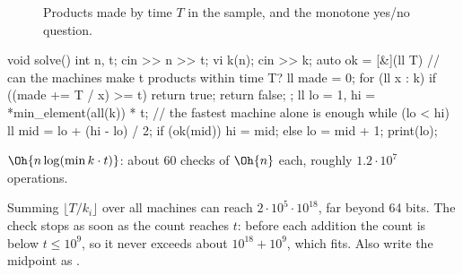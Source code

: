 \begin{figure}[H]
\centering
{}
\caption{Products made by time $T$ in the sample, and the monotone yes/no question.}
\end{figure}

\begin{code}
void solve() {
    int n, t;
    cin >> n >> t;
    vi k(n);
    cin >> k;
    auto ok = [&](ll T) {  // can the machines make t products within time T?
        ll made = 0;
        for (ll x : k)
            if ((made += T / x) >= t) return true;
        return false;
    };
    ll lo = 1, hi = *min_element(all(k)) * t;  // the fastest machine alone is enough
    while (lo < hi) {
        ll mid = lo + (hi - lo) / 2;
        if (ok(mid)) hi = mid;
        else lo = mid + 1;
    }
    print(lo);
}
\end{code}

 $\Oh{n \log(\min k \cdot t)}$: about 60 checks of $\Oh{n}$ each, roughly $1.2\cdot10^7$ operations.

\begin{pitfall}
Summing $\lfloor T/k_i\rfloor$ over all machines can reach $2\cdot10^5 \cdot 10^{18}$, far beyond 64 bits. The check stops
as soon as the count reaches $t$: before each addition the count is below $t \le 10^9$, so it never exceeds about
$10^{18} + 10^9$, which fits. Also write the midpoint as .
\end{pitfall}

